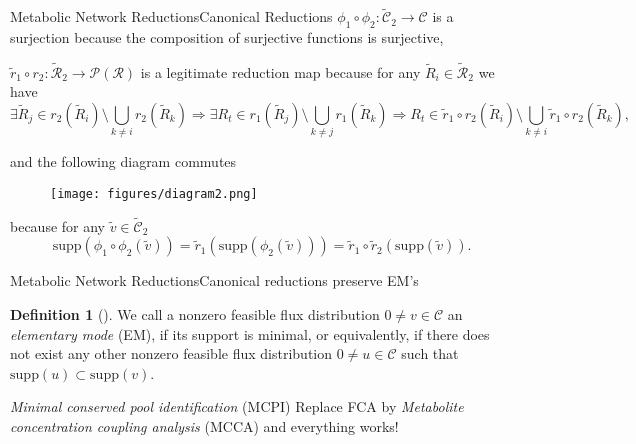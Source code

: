 \documentclass[10pt]{beamer}
\theoremstyle{remark}
\theoremstyle{definition}
\newtheorem{dfn}{Definition}
\begin{document}
\begin{frame}{Metabolic Network Reductions}{Canonical Reductions}
$\phi_1\circ\phi_2:\tilde{\mathcal{C}}_2 \rightarrow \mathcal{C}$ is a surjection 
	because the composition of surjective functions is surjective, 
	
\pause

$\tilde{r}_1\circ r_2:\tilde{\mathcal{R}}_2\rightarrow\mathcal{P}(\mathcal{R})$ is 
	a legitimate reduction map because for any $\tilde{R}_i\in\tilde{\mathcal{R}}_2$ we have  
	\[
	\exists \tilde{R}_j\in r_2(\tilde{R}_i)\setminus\bigcup_{k\neq i}r_2(\tilde{R}_k) \Rightarrow 
	\exists R_t\in r_1(\tilde{R}_j)\setminus\bigcup_{k\neq j}r_1(\tilde{R}_k) \Rightarrow 
	R_t\in\tilde{r}_1\circ r_2(\tilde{R}_i)\setminus\bigcup_{k\neq i}\tilde{r}_1\circ r_2(\tilde{R}_k),
	\]
	
\pause

and the following diagram commutes
	\begin{figure}[ht]
    \centering
    \texttt{[image: figures/diagram2.png]}
	\end{figure}
	because for any $\tilde{v}\in\tilde{\mathcal{C}}_2$
	\[
	\mathrm{supp}(\phi_1\circ\phi_2(\tilde{v}))=\tilde{r}_1(\mathrm{supp}(\phi_2(\tilde{v})))
	=\tilde{r}_1\circ\tilde{r}_2(\mathrm{supp}(\tilde{v})).
	\]
\end{frame}

\begin{frame}{Metabolic Network Reductions}{Canonical reductions preserve EM's}

\begin{dfn}[\cite{schuster1994elementary}]
We call a nonzero feasible flux distribution $0\neq v \in \mathcal{C}$ an \emph{elementary mode} (EM), 
if its support is minimal, or equivalently, if there does not exist any other nonzero feasible flux 
distribution $0\neq u\in\mathcal{C}$ such that $\mathrm{supp}(u) \subset \mathrm{supp}(v)$. 
\end{dfn}

\pause

\begin{block}{\emph{Minimal conserved pool identification} (MCPI)}
Replace FCA by \emph{Metabolite concentration coupling analysis} (MCCA) and everything works!
\end{block}

\end{frame}
\end{document}
